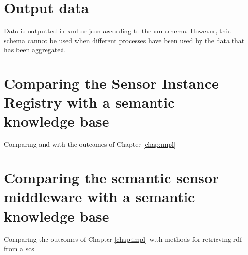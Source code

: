 \section{Output data}
Data is outputted in \ac{xml} or \ac{json} according to the \ac{om} schema. However, this schema cannot be used when different processes have been used by the data that has been aggregated.

\section{Comparing the Sensor Instance Registry with a semantic knowledge base}
Comparing \cite{SW:OGC3} and \cite{SW:OGC4} with the outcomes of Chapter \ref{chap:impl}

\section{Comparing the semantic sensor middleware with a semantic knowledge base}
Comparing the outcomes of Chapter \ref{chap:impl} with methods for retrieving \ac{rdf} from a \ac{sos}
